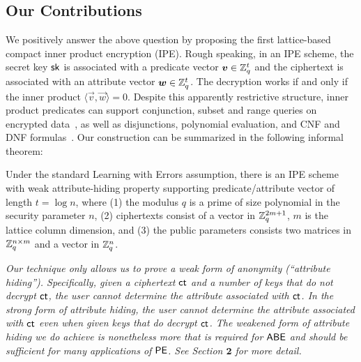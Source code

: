 \subsection{Our Contributions}
We positively answer the above question by proposing the first lattice-based compact inner product encryption (IPE). Rough speaking, in an IPE scheme, the secret key $\mathsf{sk}$ is associated with a predicate vector $\boldsymbol{v} \in \mathbb{Z}_q^t$ and the ciphertext is associated with an attribute vector $\boldsymbol{w} \in \mathbb{Z}_q^t$. The decryption works if and only if the inner product $\langle \vec{v}, \vec{w} \rangle = 0$. Despite this apparently restrictive structure, inner product predicates can support conjunction, subset and range queries on encrypted data~\cite{TCC:BonWat07}, as well as disjunctions, polynomial evaluation, and CNF and DNF formulas~\cite{EC:KatSahWat08}. Our construction can be summarized in the following informal theorem:
\begin{theorem}[Main]
Under the standard Learning with Errors assumption, there is an IPE scheme with weak attribute-hiding property supporting predicate/attribute vector of length $t = \log n$, where (1) the modulus $q$ is a prime of size polynomial in the security parameter $n$, (2) ciphertexts consist of a vector in $\mathbb{Z}_q^{2m + 1}$, $m$ is the lattice column dimension, and (3) the public parameters consists two matrices in $\mathbb{Z}_q^{n \times m}$ and a vector in $\mathbb{Z}_q^n$.
\end{theorem}

\begin{remark}\label{rem:sec}
\emph{
Our technique only allows us to prove a weak form of anonymity (``attribute hiding''). Specifically, given a ciphertext $\mathsf{ct}$ and a number of keys that do not decrypt $\mathsf{ct}$, the user cannot determine the attribute associated with $\mathsf{ct}$. In the strong form of attribute hiding, the user cannot determine the attribute associated with $\mathsf{ct}$ even when given keys that do decrypt $\mathsf{ct}$. The weakened form of attribute hiding we do achieve is nonetheless more that is required for $\mathsf{ABE}$ and should be sufficient for many applications of $\mathsf{PE}$. See Section $\textbf{2}$ for more detail.
}
\end{remark}

